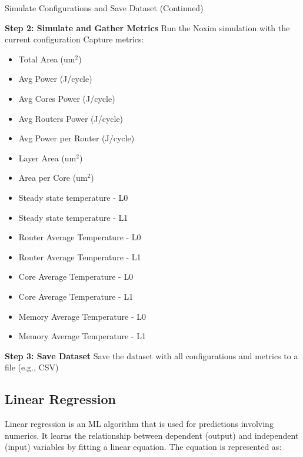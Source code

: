 \documentclass[conference]{IEEEtran}
\begin{document}
\begin{algorithm}[H]
\caption{Simulate Configurations and Save Dataset (Continued)}
\label{algo_step2_3}
\begin{algorithmic}[1]
    \State \textbf{Step 2: Simulate and Gather Metrics}
        \State Run the Noxim simulation with the current configuration
        \State Capture metrics:
            \begin{itemize}
                \item Total Area (um\(^2\))
                \item Avg Power (J/cycle)
                \item Avg Cores Power (J/cycle)
                \item Avg Routers Power (J/cycle)
                \item Avg Power per Router (J/cycle)
                \item Layer Area (um\(^2\))
                \item Area per Core (um\(^2\))
                \item Steady state temperature - L0
                \item Steady state temperature - L1
                \item Router Average Temperature - L0
                \item Router Average Temperature - L1
                \item Core Average Temperature - L0
                \item Core Average Temperature - L1
                \item Memory Average Temperature - L0
                \item Memory Average Temperature - L1
            \end{itemize}
    \EndFor
    
    \State \textbf{Step 3: Save Dataset}
    \State Save the dataset with all configurations and metrics to a file (e.g., CSV)
\end{algorithmic}
\end{algorithm}




\subsection{Linear Regression}

Linear regression is an ML algorithm that is used for predictions involving numerics. It learns the relationship between dependent (output) and independent (input) variables by fitting a linear equation. The equation is represented as:
\end{document}
